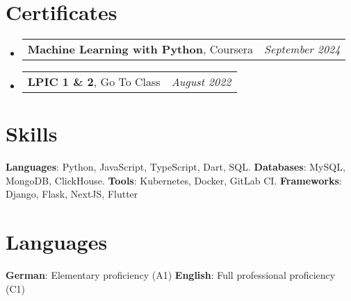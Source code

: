 \documentclass[letterpaper,11pt]{article}
\makeatletter
\newcommand{\resumeSubHeadingListStart}{\begin{itemize}[leftmargin=*]}
\newcommand{\resumeSubHeadingListEnd}{\end{itemize}}
\newcommand{\titleWithDescription}[2]{\textbf{#1}{: #2}}
\newcommand{\resumeLanguages}[4]{
  \section{Languages}
    \noindent
    \titleWithDescription{#1}{#2}
    \hfill
    \titleWithDescription{#3}{#4}
}
\newcommand{\certificateItem}[3]{
  \item\begin{tabular*}{0.97\textwidth}{l@{\extracolsep{\fill}}r}
    \small{
      \textbf{#1}{, #2 \vspace{-2pt}}
    } & \textit{\small #3} \\
  \end{tabular*}\vspace{-5pt}
}
\makeatother
\begin{document}
\section{Certificates}
  \resumeSubHeadingListStart
    \certificateItem
      {Machine Learning with Python}
      {Coursera}
      {September 2024}

    \certificateItem
      {LPIC 1 \& 2}
      {Go To Class}
      {August 2022}

  \resumeSubHeadingListEnd

%
\section{Skills}

  \titleWithDescription{Languages}{Python, JavaScript, TypeScript, Dart, SQL.}
  \hfill
  \titleWithDescription{Databases}{MySQL, MongoDB, ClickHouse.}
  \newline
  \titleWithDescription{Tools}{Kubernetes, Docker, GitLab CI.}\vspace{2pt}
  \hfill
  \titleWithDescription{Frameworks}{Django, Flask, NextJS, Flutter}

\resumeLanguages
  {German}
  {Elementary proficiency (A1)}
  {English}
  {Full professional proficiency (C1)}

\end{document}
